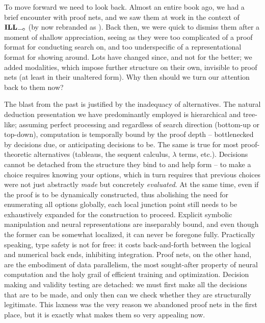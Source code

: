 To move forward we need to look back.
Almost an entire book ago, we had a brief encounter with proof nets, and we saw them at work in the context of $\ILL_{\li}$ (by now rebranded as \NLP).
Back then, we were quick to dismiss them after a moment of shallow appreciation, seeing as they were too complicated of a proof format for conducting search on, and too underspecific of a representational format for showing around.
Lots have changed since, and not for the better; we added modalities, which impose further structure on their own, invisible to proof nets (at least in their unaltered form).
Why then should we turn our attention back to them now?

The blast from the past is justified by the inadequacy of alternatives.
The natural deduction presentation we have predominantly employed is hierarchical and tree-like; assuming perfect processing and regardless of search direction (bottom-up or top-down), computation is temporally bound by the proof depth -- bottlenecked by decisions due, or anticipating decisions to be.
The same is true for most proof-theoretic alternatives (tableaus, the sequent calculus, $\lambda$ terms, etc.).
Decisions cannot be detached from the structure they bind to and help form -- to make a choice requires knowing your options, which in turn requires that previous choices were not just abstractly \textit{made} but concretely \textit{evaluated}.
At the same time, even if the proof is to be dynamically constructed, thus abolishing the need for enumerating all options globally, each local junction point still needs to be exhaustively expanded for the construction to proceed.
Explicit symbolic manipulation and neural representations are inseparably bound, and even though the former can be somewhat localized, it can never be foregone fully.
Practically speaking, type safety is not for free: it costs back-and-forth between the logical and numerical back ends, inhibiting integration.
Proof nets, on the other hand, are the embodiment of data parallelism, the most sought-after property of neural computation and the holy grail of efficient training and optimization.
Decision making and validity testing are detached: we must first make all the decisions that are to be made, and only then can we check whether they are structurally legitimate.
This laxness was the very reason we abandoned proof nets in the first place, but it is exactly what makes them so very appealing now.


